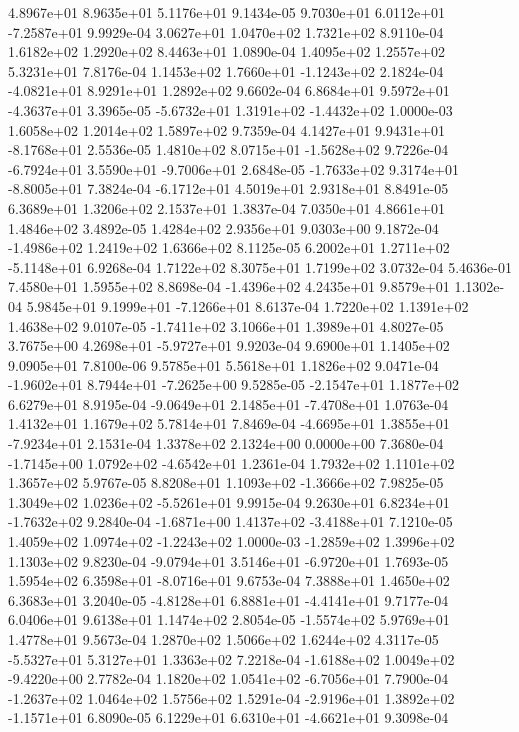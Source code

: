 4.8967e+01 8.9635e+01 5.1176e+01  9.1434e-05
 9.7030e+01  6.0112e+01 -7.2587e+01  9.9929e-04
3.0627e+01 1.0470e+02 1.7321e+02  8.9110e-04
1.6182e+02 1.2920e+02 8.4463e+01  1.0890e-04
1.4095e+02 1.2557e+02 5.3231e+01  7.8176e-04
 1.1453e+02  1.7660e+01 -1.1243e+02  2.1824e-04
-4.0821e+01  8.9291e+01  1.2892e+02  9.6602e-04
 6.8684e+01  9.5972e+01 -4.3637e+01  3.3965e-05
-5.6732e+01  1.3191e+02 -1.4432e+02  1.0000e-03
1.6058e+02 1.2014e+02 1.5897e+02  9.7359e-04
 4.1427e+01  9.9431e+01 -8.1768e+01  2.5536e-05
 1.4810e+02  8.0715e+01 -1.5628e+02  9.7226e-04
-6.7924e+01  3.5590e+01 -9.7006e+01  2.6848e-05
-1.7633e+02  9.3174e+01 -8.8005e+01  7.3824e-04
-6.1712e+01  4.5019e+01  2.9318e+01  8.8491e-05
6.3689e+01 1.3206e+02 2.1537e+01  1.3837e-04
7.0350e+01 4.8661e+01 1.4846e+02  3.4892e-05
1.4284e+02 2.9356e+01 9.0303e+00  9.1872e-04
-1.4986e+02  1.2419e+02  1.6366e+02  8.1125e-05
 6.2002e+01  1.2711e+02 -5.1148e+01  6.9268e-04
1.7122e+02 8.3075e+01 1.7199e+02  3.0732e-04
5.4636e-01 7.4580e+01 1.5955e+02  8.8698e-04
-1.4396e+02  4.2435e+01  9.8579e+01  1.1302e-04
 5.9845e+01  9.1999e+01 -7.1266e+01  8.6137e-04
1.7220e+02 1.1391e+02 1.4638e+02  9.0107e-05
-1.7411e+02  3.1066e+01  1.3989e+01  4.8027e-05
 3.7675e+00  4.2698e+01 -5.9727e+01  9.9203e-04
9.6900e+01 1.1405e+02 9.0905e+01  7.8100e-06
9.5785e+01 5.5618e+01 1.1826e+02  9.0471e-04
-1.9602e+01  8.7944e+01 -7.2625e+00  9.5285e-05
-2.1547e+01  1.1877e+02  6.6279e+01  8.9195e-04
-9.0649e+01  2.1485e+01 -7.4708e+01  1.0763e-04
1.4132e+01 1.1679e+02 5.7814e+01  7.8469e-04
-4.6695e+01  1.3855e+01 -7.9234e+01  2.1531e-04
1.3378e+02 2.1324e+00 0.0000e+00  7.3680e-04
-1.7145e+00  1.0792e+02 -4.6542e+01  1.2361e-04
1.7932e+02 1.1101e+02 1.3657e+02  5.9767e-05
 8.8208e+01  1.1093e+02 -1.3666e+02  7.9825e-05
 1.3049e+02  1.0236e+02 -5.5261e+01  9.9915e-04
 9.2630e+01  6.8234e+01 -1.7632e+02  9.2840e-04
-1.6871e+00  1.4137e+02 -3.4188e+01  7.1210e-05
 1.4059e+02  1.0974e+02 -1.2243e+02  1.0000e-03
-1.2859e+02  1.3996e+02  1.1303e+02  9.8230e-04
-9.0794e+01  3.5146e+01 -6.9720e+01  1.7693e-05
 1.5954e+02  6.3598e+01 -8.0716e+01  9.6753e-04
7.3888e+01 1.4650e+02 6.3683e+01  3.2040e-05
-4.8128e+01  6.8881e+01 -4.4141e+01  9.7177e-04
6.0406e+01 9.6138e+01 1.1474e+02  2.8054e-05
-1.5574e+02  5.9769e+01  1.4778e+01  9.5673e-04
1.2870e+02 1.5066e+02 1.6244e+02  4.3117e-05
-5.5327e+01  5.3127e+01  1.3363e+02  7.2218e-04
-1.6188e+02  1.0049e+02 -9.4220e+00  2.7782e-04
 1.1820e+02  1.0541e+02 -6.7056e+01  7.7900e-04
-1.2637e+02  1.0464e+02  1.5756e+02  1.5291e-04
-2.9196e+01  1.3892e+02 -1.1571e+01  6.8090e-05
 6.1229e+01  6.6310e+01 -4.6621e+01  9.3098e-04
